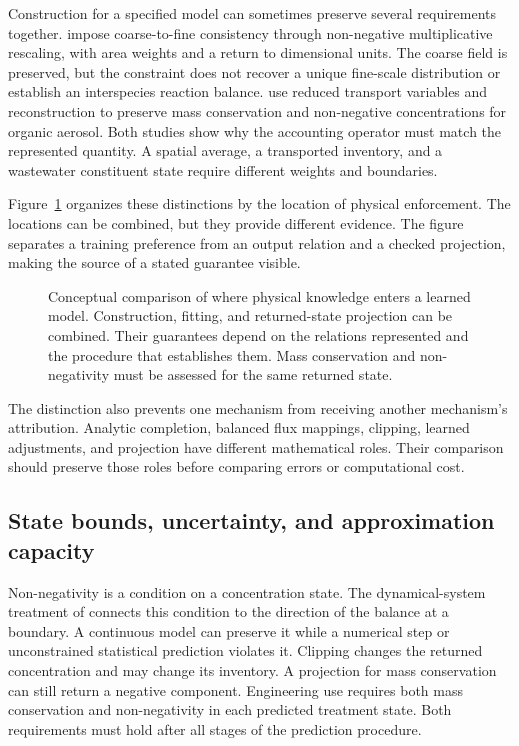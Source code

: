 Construction for a specified model can sometimes preserve several requirements together. \citet{Geiss2022} impose coarse-to-fine consistency through non-negative multiplicative rescaling, with area weights and a return to dimensional units. The coarse field is preserved, but the constraint does not recover a unique fine-scale distribution or establish an interspecies reaction balance. \citet{Sturm2023} use reduced transport variables and reconstruction to preserve mass conservation and non-negative concentrations for organic aerosol. Both studies show why the accounting operator must match the represented quantity. A spatial average, a transported inventory, and a wastewater constituent state require different weights and boundaries.

Figure~\ref{fig:rrl_enforcement_locations} organizes these distinctions by the location of physical enforcement. The locations can be combined, but they provide different evidence. The figure separates a training preference from an output relation and a checked projection, making the source of a stated guarantee visible.

\begin{figure}[htbp]
\centering
\begingroup\linespread{1}\selectfont

\endgroup
\caption{Conceptual comparison of where physical knowledge enters a learned model. Construction, fitting, and returned-state projection can be combined. Their guarantees depend on the relations represented and the procedure that establishes them. Mass conservation and non-negativity must be assessed for the same returned state.}
\label{fig:rrl_enforcement_locations}
\end{figure}

The distinction also prevents one mechanism from receiving another mechanism's attribution. Analytic completion, balanced flux mappings, clipping, learned adjustments, and projection have different mathematical roles. Their comparison should preserve those roles before comparing errors or computational cost.

\subsection{State bounds, uncertainty, and approximation capacity}

Non-negativity is a condition on a concentration state. The dynamical-system treatment of \citet{Haddad2010} connects this condition to the direction of the balance at a boundary. A continuous model can preserve it while a numerical step or unconstrained statistical prediction violates it. Clipping changes the returned concentration and may change its inventory. A projection for mass conservation can still return a negative component. Engineering use requires both mass conservation and non-negativity in each predicted treatment state. Both requirements must hold after all stages of the prediction procedure.

